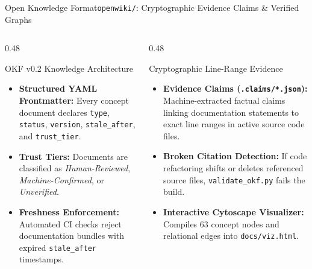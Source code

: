 \begin{frame}{Open Knowledge Format}{\texttt{openwiki/}: Cryptographic Evidence Claims \& Verified Graphs}
    \begin{columns}[T]
        \begin{column}{0.48\textwidth}
            \begin{block}{OKF v0.2 Knowledge Architecture}
                \begin{itemize}\footnotesize
                    \item \textbf{Structured YAML Frontmatter:} Every concept document declares \texttt{type}, \texttt{status}, \texttt{version}, \texttt{stale\_after}, and \texttt{trust\_tier}.
                    \item \textbf{Trust Tiers:} Documents are classified as \emph{Human-Reviewed}, \emph{Machine-Confirmed}, or \emph{Unverified}.
                    \item \textbf{Freshness Enforcement:} Automated CI checks reject documentation bundles with expired \texttt{stale\_after} timestamps.
                \end{itemize}
            \end{block}
        \end{column}
        \begin{column}{0.48\textwidth}
            \begin{block}{Cryptographic Line-Range Evidence}
                \begin{itemize}\footnotesize
                    \item \textbf{Evidence Claims (\texttt{.claims/*.json}):} Machine-extracted factual claims linking documentation statements to exact line ranges in active source code files.
                    \item \textbf{Broken Citation Detection:} If code refactoring shifts or deletes referenced source files, \texttt{validate\_okf.py} fails the build.
                    \item \textbf{Interactive Cytoscape Visualizer:} Compiles 63 concept nodes and relational edges into \texttt{docs/viz.html}.
                \end{itemize}
            \end{block}
        \end{column}
    \end{columns}

\end{frame}


